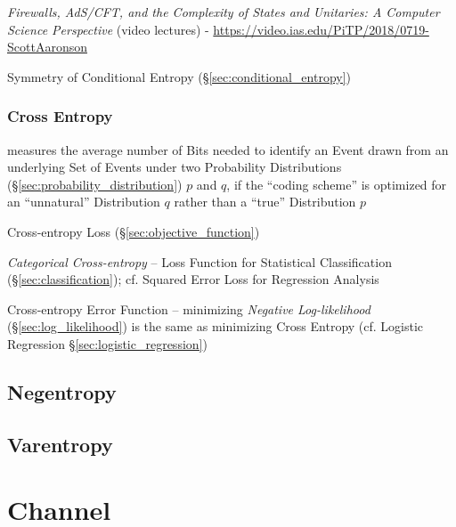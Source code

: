 \asterism

\emph{Firewalls, AdS/CFT, and the Complexity of States and Unitaries: A Computer
  Science Perspective}
(video lectures)
-
\url{https://video.ias.edu/PiTP/2018/0719-ScottAaronson}

Symmetry of Conditional Entropy (\S\ref{sec:conditional_entropy})



\subsubsection{Cross Entropy}\label{sec:cross_entropy}

measures the average number of Bits needed to identify an Event drawn from an
underlying Set of Events under two Probability Distributions
(\S\ref{sec:probability_distribution}) $p$ and $q$, if the ``coding scheme'' is
optimized for an ``unnatural'' Distribution $q$ rather than a ``true''
Distribution $p$

Cross-entropy Loss (\S\ref{sec:objective_function})

\emph{Categorical Cross-entropy} -- Loss Function for Statistical Classification
(\S\ref{sec:classification}); cf. Squared Error Loss for Regression Analysis

\fist Cross-entropy Error Function -- minimizing \emph{Negative Log-likelihood}
(\S\ref{sec:log_likelihood}) is the same as minimizing Cross Entropy (cf.
Logistic Regression \S\ref{sec:logistic_regression})



\subsection{Negentropy}\label{sec:negentropy}

\subsection{Varentropy}\label{sec:varentropy}



\section{Channel}\label{sec:channel}

